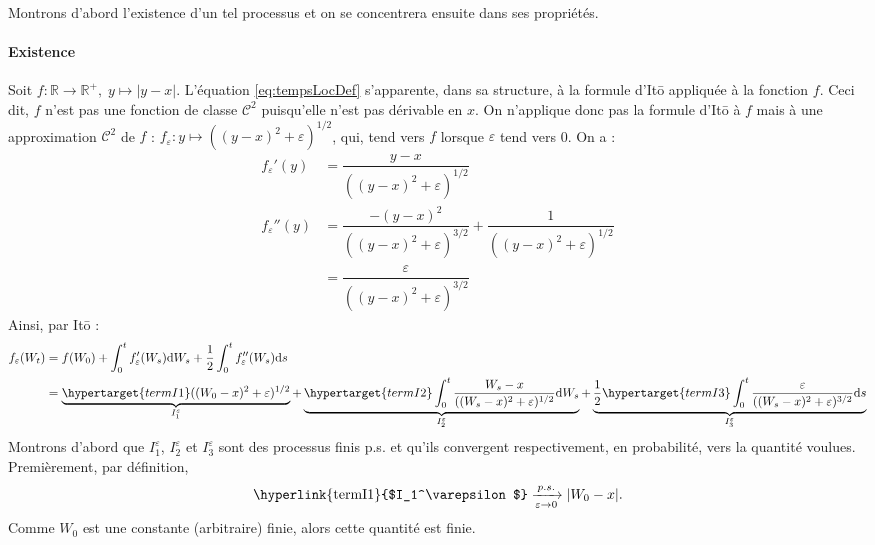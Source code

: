 \documentclass[openany]{book}
\makeatletter
\newcommand{\R}{\mathbb{R}}
\newcommand{\1}{\mathbbm{1}}
\renewcommand{\d}{\mathrm{d}}
\renewenvironment{proof}[1][\textbf{\textit{Démonstration}}]{%
  \par\pushQED{\qed}%
  \normalfont\topsep6\p@\@plus6\p@\relax
  \trivlist\item[\hskip\labelsep
    #1\@addpunct{.}]\ignorespaces
}{%
  \popQED\endtrivlist\@endpefalse
}
\theoremstyle{thmfont}
\theoremstyle{deffont}
\theoremstyle{thmfont}
\theoremstyle{deffont}
\makeatother
\begin{document}
\begin{proof} Montrons d'abord l'existence d'un tel processus et on se concentrera ensuite dans ses propriétés.

  \paragraph{Existence}
  Soit $f : \R \rightarrow \R^+,\; y \mapsto |y-x|$. L'équation \eqref{eq:tempsLocDef} s'apparente, dans sa structure, à la formule d'Itō appliquée à la fonction $f$. Ceci dit, $f$ n'est pas une fonction de classe $\mathcal C^2$ puisqu'elle n'est pas dérivable en $x$. On n'applique donc pas la formule d'Itō à $f$ mais à une approximation $\mathcal C^2$ de $f$ : $f_\varepsilon : y \mapsto ((y-x)^2 +\varepsilon)^{1/2}$, qui, tend vers $f$ lorsque $\varepsilon$ tend vers 0. On a :
  \begin{align*}
    f_\varepsilon'(y) &= \dfrac{y-x}{((y-x)^2 +\varepsilon)^{1/2}}\\
    f_\varepsilon''(y)&= \dfrac{-(y-x)^2}{((y-x)^2 +\varepsilon)^{3/2}} + \dfrac{1}{((y-x)^2 +\varepsilon)^{1/2}}\\
              &= \dfrac{\varepsilon}{((y-x)^2 +\varepsilon)^{3/2}}
  \end{align*}
  Ainsi, par Itō :
  \begin{align}
    f_\varepsilon(W_t) &= f(W_0) + \int_0^t f_\varepsilon'(W_s) \d W_s + \dfrac{1}{2} \int_0^t f_\varepsilon''(W_s) \d s\label{eq:tempsLocApprox}\\
             &= \underbrace{\hypertarget{termI1}((W_0 -x)^2 + \varepsilon)^{1/2}}_{I_1^\varepsilon}
               + \underbrace{\hypertarget{termI2}\int_0^t \dfrac{W_s-x}{((W_s-x)^2 +\varepsilon)^{1/2}}\d W_s}_{I_2^\varepsilon}
               + \underbrace{ \dfrac{1}{2} \hypertarget{termI3} \int_0^t \dfrac{\varepsilon}{((W_s-x)^2 +\varepsilon)^{3/2}} \d s}_{I_3^\varepsilon} \notag
  \end{align}
  Montrons d'abord que \hyperlink{termI1}{$I_1^\varepsilon$}, \hyperlink{termI2}{$I_2^\varepsilon$} et \hyperlink{termI1}{$I_3^\varepsilon$} sont des processus finis p.s. et qu'ils convergent respectivement, en probabilité, vers la quantité voulues. Premièrement, par définition,
  \begin{equation}\text{\hyperlink{termI1}{$I_1^\varepsilon$}} \xrightarrow[\varepsilon \to 0]{p.s.}  |W_0 -x|.\end{equation}
  \noindent Comme $W_0$ est une constante (arbitraire) finie, alors cette quantité est finie.\\


\end{proof}
\end{document}
